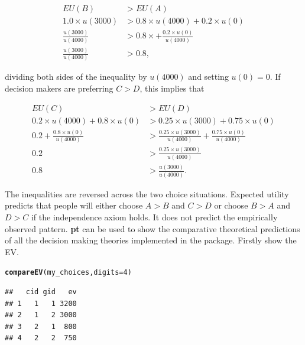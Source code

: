 \documentclass{article}\usepackage[]{graphicx}\usepackage[]{color}
\makeatletter
\newcommand{\hlnum}[1]{\textcolor[rgb]{0.686,0.059,0.569}{#1}}%
\newcommand{\hlstd}[1]{\textcolor[rgb]{0.345,0.345,0.345}{#1}}%
\newcommand{\hlkwc}[1]{\textcolor[rgb]{0.333,0.667,0.333}{#1}}%
\newcommand{\hlkwd}[1]{\textcolor[rgb]{0.737,0.353,0.396}{\textbf{#1}}}%
\newenvironment{kframe}{%
 \def\at@end@of@kframe{}%
 \ifinner\ifhmode%
  \def\at@end@of@kframe{\end{minipage}}%
  \begin{minipage}{\columnwidth}%
 \fi\fi%
 \def\FrameCommand##1{\hskip\@totalleftmargin \hskip-\fboxsep
 \colorbox{shadecolor}{##1}\hskip-\fboxsep
     \hskip-\linewidth \hskip-\@totalleftmargin \hskip\columnwidth}%
 \MakeFramed {\advance\hsize-\width
   \@totalleftmargin\z@ \linewidth\hsize
   \@setminipage}}%
 {\par\unskip\endMakeFramed%
 \at@end@of@kframe}
\newenvironment{knitrout}{}{} %
\makeatother
\begin{document}
\begin{equation}
\begin{split}
EU(B) &> EU(A)\\
1.0 \times u(3000) &> 0.8 \times u(4000) + 0.2 \times u(0)\\
\frac{u(3000)}{u(4000)} &> 0.8 \times + \frac{0.2 \times u(0)}{u(4000)}\\
\frac{u(3000)}{u(4000)} &> 0.8,
\end{split}
\end{equation}

dividing both sides of the inequality by $u(4000)$ and setting $u(0) = 0$. If decision makers are preferring $C > D$, this implies that

\begin{equation}
\begin{split}
EU(C) &> EU(D)\\
0.2 \times u(4000) + 0.8 \times u(0) &> 0.25 \times u(3000) + 0.75 \times u(0)\\
0.2 + \frac{0.8 \times u(0)}{u(4000)} &> \frac{0.25 \times u(3000)}{u(4000)} + \frac{0.75 \times u(0)}{u(4000)}\\
0.2 &> \frac{0.25 \times u(3000)}{u(4000)}\\
0.8 &> \frac{u(3000)}{u(4000)}.
\end{split}
\end{equation}

The inequalities are reversed across the two choice situations. Expected utility predicts that people will either choose $A > B$ and $C > D$ or choose $B > A$ and $D > C$ if the independence axiom holds. It does not predict the empirically observed pattern. {\bf pt} can be used to show the comparative theoretical predictions of all the decision making theories implemented in the package. Firstly show the EV.

\begin{knitrout}
\color{fgcolor}\begin{kframe}
\begin{alltt}
\hlkwd{compareEV}\hlstd{(my_choices,} \hlkwc{digits}\hlstd{=}\hlnum{4}\hlstd{)}
\end{alltt}
\begin{verbatim}
##   cid gid   ev
## 1   1   1 3200
## 2   1   2 3000
## 3   2   1  800
## 4   2   2  750
\end{verbatim}
\end{kframe}
\end{knitrout}
\end{document}
